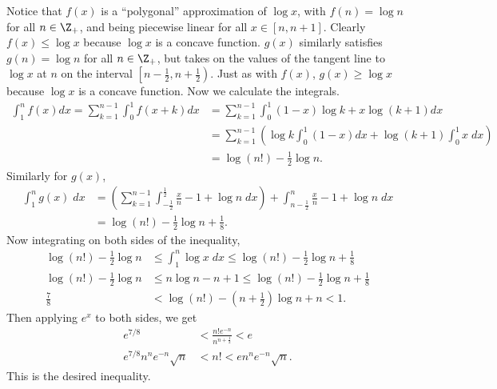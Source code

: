 \documentclass[11pt,letterpaper]{article}
\begin{document}
\begin{solution}
    Notice that $f(x)$ is a ``polygonal'' approximation of $\log x$, with $f(n)=\log n$ for all $n\in \Z_+$, and being piecewise linear for all $x\in [n,n+1]$. Clearly $f(x)\leq \log x$ because $\log x$ is a concave function. $g(x)$ similarly satisfies $g(n)=\log n$ for all $n\in \Z_+$, but takes on the values of the tangent line to $\log x$ at $n$ on the interval $\left[n-\frac{1}{2}, n+\frac{1}{2}\right)$. Just as with $f(x)$, $g(x) \geq \log x$ because $\log x$ is a concave function. Now we calculate the integrals.
    \[
        \begin{aligned}
            \int^n_1 f(x) dx = \sum^{n-1}_{k=1} \int_{0}^{1} f(x+k) dx &= \sum^{n-1}_{k=1} \int^1_0(1-x)\log k + x\log (k+1)dx\\
            &=\sum^{n-1}_{k=1}\left(\log k\int^1_0(1-x)dx + \log(k+1)\int^1_0 x\;dx\right)\\
            &= \log(n!) - \frac{1}{2}\log n.
        \end{aligned}
    \] 
    Similarly for $g(x)$,
    \[
        \begin{aligned}
            \int^n_1 g(x)\;dx &= \left(\sum^{n-1}_{k=1}\int^{\frac{1}{2}}_{-\frac{1}{2}} \frac{x}{n}-1+\log n\;dx\right)+\int^{n}_{n-\frac{1}{2}}\frac{x}{n}-1+\log n\;dx\\
            &= \log (n!) - \frac{1}{2}\log n +\frac{1}{8}.
        \end{aligned}
    \] 
    Now integrating on both sides of the inequality,
    \[
        \begin{aligned}
            \log (n!)-\frac{1}{2}\log n &\leq \int^n_1 \log x \;dx \leq \log (n!) -\frac{1}{2}\log n+\frac{1}{8}\\
            \log (n!)-\frac{1}{2}\log n&\leq n\log n - n+1\leq \log(n!)-\frac{1}{2}\log n + \frac{1}{8}\\
            \frac{7}{8} &< \log (n!) - \left(n+\frac{1}{2}\right)\log n + n < 1.
        \end{aligned}
    \]
    Then applying $e^x$ to both sides, we get
    \[
        \begin{aligned}
            e^{7 /8} &< \frac{n! e^{-n}}{n^{n+\frac{1}{2}}} < e\\
            e^{7 /8}n^n e^{-n}\sqrt{n} &< n! < en^ne^{-n}\sqrt{n}.
        \end{aligned}
    \] 
    This is the desired inequality.
\end{solution}
\end{document}
